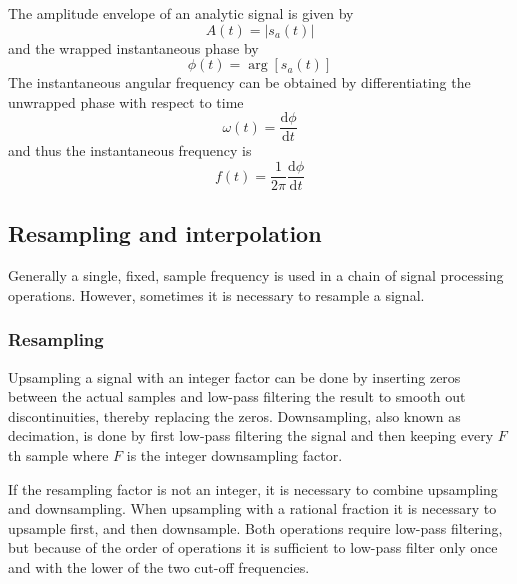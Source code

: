 The amplitude envelope of an analytic signal is given by
\begin{equation}
 A(t) = |s_a(t)|
\end{equation}
and the wrapped instantaneous phase by
\begin{equation}
 \phi(t) = \arg{\left[s_a(t) \right]}
\end{equation}
The instantaneous angular frequency can be obtained by differentiating the unwrapped phase with respect to time
\begin{equation}
 \omega (t) = \frac{\mathrm{d}\phi}{\mathrm{d}t}
\end{equation}
and thus the instantaneous frequency is
\begin{equation}
 f (t) = \frac{1}{2\pi} \frac{\mathrm{d}\phi}{\mathrm{d}t}
\end{equation}

%
%

\subsection{Resampling and interpolation}\label{sec:theory:signal:resampling}
Generally a single, fixed, sample frequency is used in a chain of signal
processing operations. However, sometimes it is necessary to resample a signal.

\subsubsection{Resampling}
Upsampling a signal with an integer factor can be done by inserting zeros
between the actual samples and low-pass filtering the result to smooth out
discontinuities, thereby replacing the zeros. Downsampling, also known as
decimation, is done by first low-pass filtering the signal and then keeping
every $F$th sample where $F$ is the integer downsampling factor.

If the resampling factor is not an integer, it is necessary to combine
upsampling and downsampling. When upsampling with a rational fraction it is
necessary to upsample first, and then downsample. Both operations require
low-pass filtering, but because of the order of operations it is sufficient to
low-pass filter only once and with the lower of the two cut-off frequencies.

